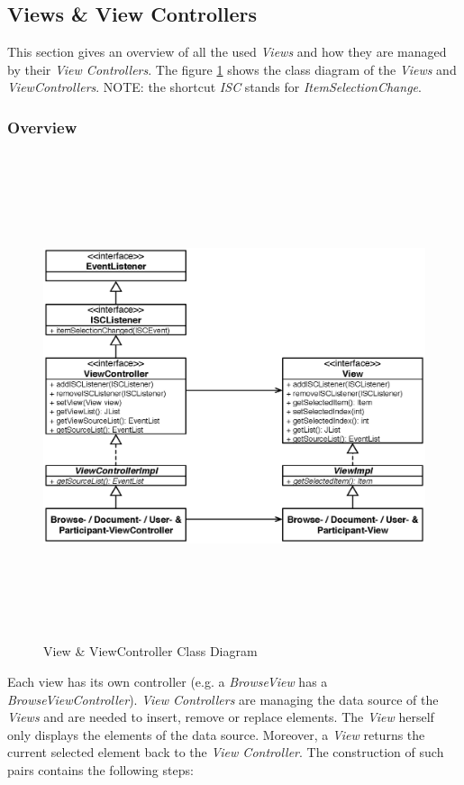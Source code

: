 \subsection{Views \& View Controllers}
This section gives an overview of all the used \textit{Views} and how they are managed by their \textit{View Controllers}. The figure \ref{application_views_controllers} shows the class diagram of the \textit{Views} and \textit{ViewControllers}. NOTE: the shortcut \textit{ISC} stands for \textit{ItemSelectionChange}.
\subsubsection{Overview}
\begin{figure}[H]
\begin{center}
  \includegraphics[height=5.62in, width=7.19in]{../images/finalreport/application_views_controllers.eps}
\caption{View \& ViewController Class Diagram}
\label{application_views_controllers}
\end{center}
\end{figure}
Each view has its own controller (e.g. a \textit{BrowseView} has a \textit{BrowseViewController}). \textit{View Controllers} are managing the data source of the \textit{Views} and are needed to insert, remove or replace elements. The \textit{View} herself only displays the elements of the data source. Moreover, a \textit{View} returns the current selected element back to the \textit{View Controller}. The construction of such pairs contains the following steps:
